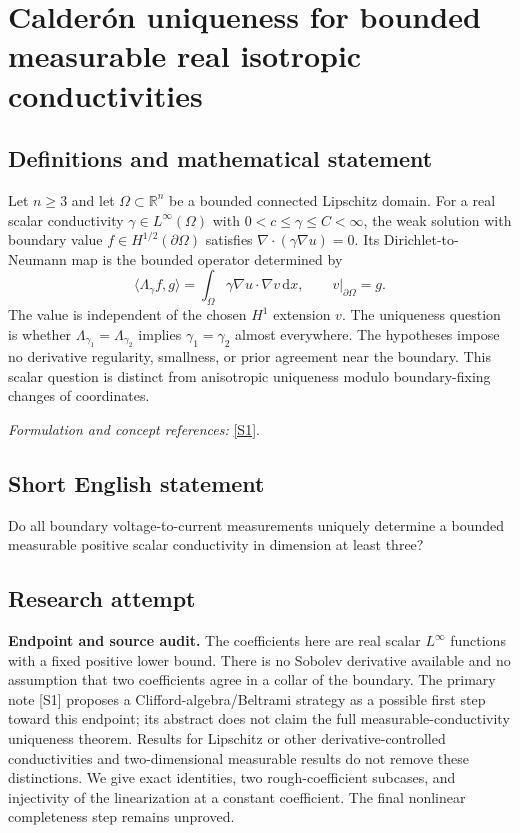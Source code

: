 \documentclass[11pt]{article}
\begin{document}
\section*{\texorpdfstring{Calderón uniqueness for bounded measurable real isotropic conductivities}{Calderón uniqueness for bounded measurable real isotropic conductivities}}\label{30006854}
\subsection{Definitions and mathematical statement}
Let $n\ge3$ and let $\Omega\subset{\mathbb{R}}^n$ be a bounded connected Lipschitz domain. For a real scalar conductivity $\gamma\in L^\infty(\Omega)$ with $0<c\le\gamma\le C<\infty$, the weak solution with boundary value $f\in H^{1/2}(\partial\Omega)$ satisfies $\nabla\cdot(\gamma\nabla u)=0$. Its Dirichlet-to-Neumann map is the bounded operator determined by
\[
 \langle\Lambda_\gamma f,g\rangle
 =\int_\Omega\gamma\nabla u\cdot\nabla v{\,\mathrm{d}} x,
 \qquad v|_{\partial\Omega}=g.
\]
The value is independent of the chosen $H^1$ extension $v$. The uniqueness question is whether $\Lambda_{\gamma_1}=\Lambda_{\gamma_2}$ implies $\gamma_1=\gamma_2$ almost everywhere. The hypotheses impose no derivative regularity, smallness, or prior agreement near the boundary. This scalar question is distinct from anisotropic uniqueness modulo boundary-fixing changes of coordinates.
\par\smallskip\textit{Formulation and concept references:} \href{https://arxiv.org/pdf/1803.06931v2}{[S1]}.

\subsection{Short English statement}
Do all boundary voltage-to-current measurements uniquely determine a bounded measurable positive scalar conductivity in dimension at least three?
\subsection{Research attempt}
\textbf{Endpoint and source audit.}
The coefficients here are real scalar $L^\infty$ functions with a fixed
positive lower bound.  There is no Sobolev derivative available and no
assumption that two coefficients agree in a collar of the boundary.
The primary note [S1] proposes a Clifford-algebra/Beltrami strategy as a
possible first step toward this endpoint; its abstract does not claim the
full measurable-conductivity uniqueness theorem.  Results for Lipschitz or
other derivative-controlled conductivities and two-dimensional measurable
results do not remove these distinctions.  We give exact identities, two
rough-coefficient subcases, and injectivity of the linearization at a constant
coefficient.  The final nonlinear completeness step remains unproved.
\end{document}
